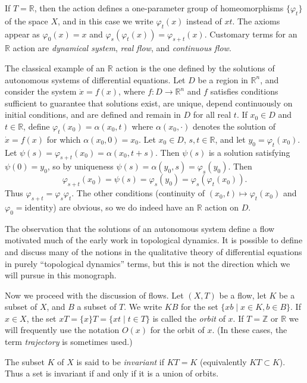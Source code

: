 If $T = \mathbb{R}$, then the action defines a one-parameter group of homeomorphisms $\{\varphi_{t}\}$ of the space $X$, and in this case we write $\varphi_{t}(x)$ instead of $xt$. The axioms appear as $\varphi_{0}(x) = x$ and $\varphi_{s}(\varphi_{t}(x)) = \varphi_{s+t}(x)$. Customary terms for an $\mathbb{R}$ action are \emph{dynamical system}, \emph{real flow}, and \emph{continuous flow}.

The classical example of an $\mathbb{R}$ action is the one defined by the solutions of autonomous systems of differential equations. Let $D$ be a region in $\mathbb{R}^{n}$, and consider the system $\dot{x} = f(x)$, where $f : D \to \mathbb{R}^{n}$ and $f$ satisfies conditions sufficient to guarantee that solutions exist, are unique, depend continuously on initial conditions, and are defined and remain in $D$ for all real $t$. If $x_{0} \in D$ and $t \in \mathbb{R}$, define $\varphi_{t}(x_{0}) = \alpha(x_{0},t)$ where $\alpha(x_{0},\cdot)$ denotes the solution of $\dot{x} = f(x)$ for which $\alpha(x_{0},0) = x_{0}$. Let $x_{0} \in D$, $s,t \in \mathbb{R}$, and let $y_{0} = \varphi_{t}(x_{0})$. Let $\psi(s) = \varphi_{s+t}(x_{0}) = \alpha(x_{0},t+s)$. Then $\psi(s)$ is a solution satisfying $\psi(0) = y_{0}$, so by uniqueness $\psi(s) = \alpha(y_{0},s) = \varphi_{s}(y_{0})$. Then
\[
    \varphi_{s+t}(x_{0}) = \psi(s) = \varphi_{s}(y_{0}) = \varphi_{s}(\varphi_{t}(x_{0})).
\]
Thus $\varphi_{s+t} = \varphi_{s}\varphi_{t}$. The other conditions (continuity of $(x_{0},t) \mapsto \varphi_{t}(x_{0})$ and $\varphi_{0} = \text{identity}$) are obvious, so we do indeed have an $\mathbb{R}$ action on $D$.


The observation that the solutions of an autonomous system define a flow motivated much of the early work in topological dynamics. It is possible to define and discuss many of the notions in the qualitative theory of differential equations in purely ``topological dynamics'' terms, but this is not the direction which we will pursue in this monograph.

Now we proceed with the discussion of flows. Let $(X,T)$ be a flow, let $K$ be a subset of $X$, and $B$ a subset of $T$. We write $KB$ for the set $\{xb \mid x \in K, b \in B\}$. If $x \in X$, the set $xT = \{x\}T = \{xt \mid t \in T\}$ is called the \emph{orbit} of $x$. If $T = \mathbb{Z}$ or $\mathbb{R}$ we will frequently use the notation $O(x)$ for the orbit of $x$. (In these cases, the term \emph{trajectory} is sometimes used.)

The subset $K$ of $X$ is said to be \emph{invariant} if $KT = K$ (equivalently $KT \subset K$). Thus a set is invariant if and only if it is a union of orbits.


